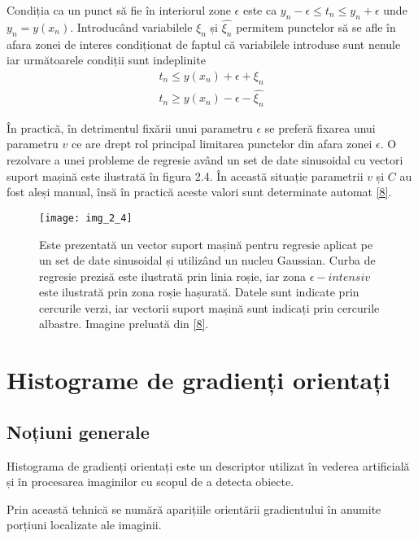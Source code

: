 Condiția ca un punct să fie în interiorul zone $ \epsilon $ este ca $y_n - \epsilon \leq t_n \leq y_n + \epsilon$ unde $y_n = y(x_n)$. Introducând variabilele $\xi_n$ și $\widehat{\xi_n}$ permitem punctelor să se afle în afara zonei de interes condiționat de faptul că variabilele introduse sunt nenule iar următoarele condiții sunt indeplinite
\begin{align}	
	t_n \leq y(x_n) + \epsilon + \xi_n
\end{align}
\begin{align}	
	t_n \geq y(x_n) - \epsilon - \widehat{\xi_n}
\end{align}

În practică, în detrimentul fixării unui parametru $\epsilon$ se preferă fixarea unui parametru $v$ ce are drept rol principal limitarea punctelor din afara zonei $\epsilon$. O rezolvare a unei probleme de regresie având un set de date sinusoidal cu vectori suport mașină este ilustrată în figura 2.4. În această situație parametrii $v$ și $C$ au fost aleși manual, însă în practică aceste valori sunt determinate automat \hyperlink{ChristopherBishop}{[8]}.
\begin{figure}[!h]
	\centering
	\texttt{[image: img\_2\_4]}
	\caption[Mașini cu vector suport pentru regresie 3]{Este prezentată un vector suport mașină pentru regresie aplicat pe un set de date sinusoidal și utilizând un nucleu Gaussian. Curba de regresie prezisă este ilustrată prin linia roșie, iar zona $\epsilon - intensiv$ este ilustrată prin zona roșie hașurată. Datele sunt indicate prin cercurile verzi, iar vectorii suport mașină sunt indicați prin cercurile albastre. Imagine preluată din \hyperlink{ChristopherBishop}{[8]}.}
\end{figure}

\section{Histograme de gradienți orientați}

\subsection{Noțiuni generale}

Histograma de gradienți orientați este un descriptor utilizat în vederea artificială și în procesarea imaginilor cu scopul de a detecta obiecte. 

Prin această tehnică se numără aparițiile orientării gradientului în anumite porțiuni localizate ale imaginii.


